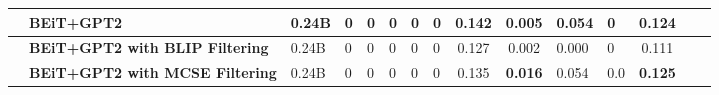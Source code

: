 \begin{table}
\begin{tabularx}{0.8\linewidth}{l l H HH HH Hc cH Hccc}
& \textbf{BEiT+GPT2} & 0.24B & 0 & 0 & 0 & 0 & 0 &  \textbf{0.142} & {0.005} & 0.054  & 0 & 0.124 \\ 
\midrule
& \textbf{BEiT+GPT2 with BLIP Filtering} & 0.24B & 0 & 0 & 0 & 0 & 0 &  0.127 & {0.002} & 0.000  & 0 & 0.111 \\ 
& \textbf{BEiT+GPT2 with MCSE Filtering} & 0.24B & 0 & 0 & 0 & 0 & 0 &  0.135 & \textbf{0.016} & 0.054  & 0.0 & \textbf{0.125} \\ 








\end{tabularx}
\end{table}
